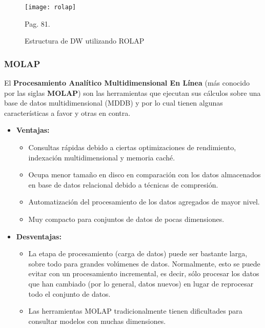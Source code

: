 \documentclass[a4paper,11pt]{article}
\begin{document}
    \begin{figure}
      \begin{center}
        \texttt{[image: rolap]}
        \caption{Estructura de DW utilizando ROLAP} \cite{nagabhushana} Pag. 81.
        \label{rolap}
      \end{center}
    \end{figure}
    
    \subsubsection{MOLAP}
    
    El \textbf{Procesamiento Analítico Multidimensional En Línea} (más conocido por las siglas \textbf{MOLAP}) son las herramientas que ejecutan sus
    cálculos sobre una base de datos multidimensional (MDDB) y por lo cual tienen algunas características a favor y otras en contra.
    
    \begin{itemize}
      \item \textbf{Ventajas:}
        \begin{itemize}
          \item Consultas rápidas debido a ciertas optimizaciones de rendimiento, indexación multidimensional y memoria caché.
          \item Ocupa menor tamaño en disco en comparación con los datos almacenados en base de datos relacional debido a técnicas de compresión.
          \item Automatización del procesamiento de los datos agregados de mayor nivel.
          \item Muy compacto para conjuntos de datos de pocas dimensiones.
        \end{itemize}
      \item \textbf{Desventajas:}
        \begin{itemize}
          \item La etapa de procesamiento (carga de datos) puede ser bastante larga, sobre todo para grandes volúmenes de datos. Normalmente, esto se
          puede evitar con un procesamiento incremental, es decir, sólo procesar los datos que han cambiado (por lo general, datos nuevos) en lugar de
          reprocesar todo el conjunto de datos.
          \item Las herramientas MOLAP tradicionalmente tienen dificultades para consultar modelos con muchas dimensiones.
        \end{itemize}
    \end{itemize} 
    
\end{document}
